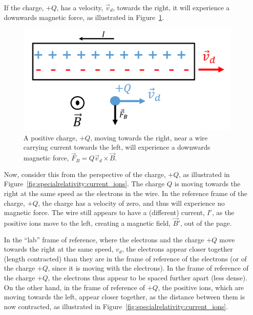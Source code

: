 If the charge, $+Q$, has a velocity, $\vec v_d$, towards the right, it will experience a downwards magnetic force, as illustrated in Figure~\ref{fig:specialrelativity:current_force}.

\begin{figure}[!htbp]
\centering
\includegraphics[width=0.5\linewidth]{files/current_force-891d7a63e028add2e0522c709e873359.png}
\caption[]{A positive charge, $+Q$, moving towards the right, near a wire carrying current towards the left, will experience a downwards magnetic force, $\vec F_B=Q \vec v_d\times \vec B$.}
\label{fig:specialrelativity:current_force}
\end{figure}

Now, consider this from the perspective of the charge, $+Q$, as illustrated in Figure~\ref{fig:specialrelativity:current_ions}. The charge $Q$ is moving towards the right at the same speed as the electrons in the wire. In the reference frame of the charge, $+Q$, the charge has a velocity of zero, and thus will experience no magnetic force. The wire still appears to have a (different) current, $I'$, as the positive ions move to the left, creating a magnetic field, $\vec B'$, out of the page.

In the ``lab'' frame of reference, where the electrons and the charge $+Q$ move towards the right at the same speed, $v_d$, the electrons appear closer together (length contracted) than they are in the frame of reference of the electrons (or of the charge $+Q$, since it is moving with the electrons). In the frame of reference of the charge $+Q$, the electrons thus appear to be spaced further apart (less dense). On the other hand, in the frame of reference of $+Q$, the positive ions, which are moving towards the left, appear closer together, as the distance between them is now contracted, as illustrated in Figure~\ref{fig:specialrelativity:current_ions}.

